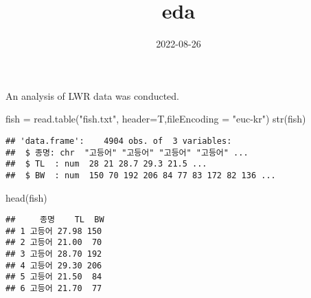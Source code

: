 \documentclass[
]{article}
\title{eda}
\author{}
\date{\vspace{-2.5em}2022-08-26}
\newenvironment{Shaded}{\begin{snugshade}}{\end{snugshade}}
\newcommand{\AttributeTok}[1]{\textcolor[rgb]{0.77,0.63,0.00}{#1}}
\newcommand{\FunctionTok}[1]{\textcolor[rgb]{0.00,0.00,0.00}{#1}}
\newcommand{\NormalTok}[1]{#1}
\newcommand{\OtherTok}[1]{\textcolor[rgb]{0.56,0.35,0.01}{#1}}
\newcommand{\SpecialCharTok}[1]{\textcolor[rgb]{0.00,0.00,0.00}{#1}}
\newcommand{\StringTok}[1]{\textcolor[rgb]{0.31,0.60,0.02}{#1}}
\begin{document}
\maketitle

An analysis of LWR data was conducted.

\begin{Shaded}
\begin{Highlighting}[]
\NormalTok{fish }\OtherTok{=} \FunctionTok{read.table}\NormalTok{(}\StringTok{"fish.txt"}\NormalTok{, }\AttributeTok{header=}\NormalTok{T,}\AttributeTok{fileEncoding =} \StringTok{"euc{-}kr"}\NormalTok{)}
\FunctionTok{str}\NormalTok{(fish)}
\end{Highlighting}
\end{Shaded}

\begin{verbatim}
## 'data.frame':    4904 obs. of  3 variables:
##  $ 종명: chr  "고등어" "고등어" "고등어" "고등어" ...
##  $ TL  : num  28 21 28.7 29.3 21.5 ...
##  $ BW  : num  150 70 192 206 84 77 83 172 82 136 ...
\end{verbatim}

\begin{Shaded}
\begin{Highlighting}[]
\FunctionTok{head}\NormalTok{(fish)}
\end{Highlighting}
\end{Shaded}

\begin{verbatim}
##     종명    TL  BW
## 1 고등어 27.98 150
## 2 고등어 21.00  70
## 3 고등어 28.70 192
## 4 고등어 29.30 206
## 5 고등어 21.50  84
## 6 고등어 21.70  77
\end{verbatim}

\begin{Shaded}
\end{Shaded}
\end{document}

